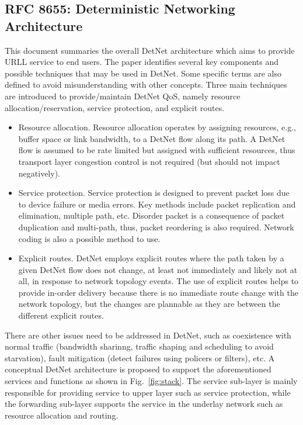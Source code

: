 \documentclass[12pt]{article}
\begin{document}
\subsection{RFC 8655: Deterministic Networking Architecture~\cite{finn2019deterministic}}
This document summaries the overall DetNet architecture which aims to provide URLL service to end users. The paper identifies several key components and possible techniques that may be used in DetNet. Some specific terms are also defined to avoid misunderstanding with other concepts. 
Three main techniques are introduced to provide/maintain DetNet QoS, namely resource allocation/reservation, service protection, and explicit routes.
\begin{itemize}
    \item Resource allocation. Resource allocation operates by assigning resources, e.g., buffer space or link bandwidth, to a DetNet flow along its path. A DetNet flow is assumed to be rate limited but assigned with sufficient resources, thus transport layer congestion control is not required (but should not impact negatively).
    \item Service protection. Service protection is designed to prevent packet loss due to device failure or media errors. Key methods include packet replication and elimination, multiple path, etc. Disorder packet is a consequence of packet duplication and multi-path, thus, packet reordering is also required. Network coding is also a possible method to use.
    \item Explicit routes.  DetNet employs explicit routes where the path taken by a given DetNet flow does not change, at least not immediately and likely not at all, in response to network topology events. The use of explicit routes helps to provide in-order delivery because there is no immediate route change with the network topology, but the changes are plannable as they are between the different explicit routes.
\end{itemize}
There are other issues need to be addressed in DetNet, such as coexistence with normal traffic (bandwidth sharinng, traffic shaping and scheduling to avoid starvation), fault mitigation (detect failures using policers or filters), etc. 
A conceptual DetNet architecture is proposed to support the aforementioned services and functions as shown in Fig.~\ref{fig:stack}. The service sub-layer is mainly responsible for providing service to upper layer such as service protection, while the forwarding sub-layer supports the service in the underlay network such as resource allocation and routing.
\end{document}
